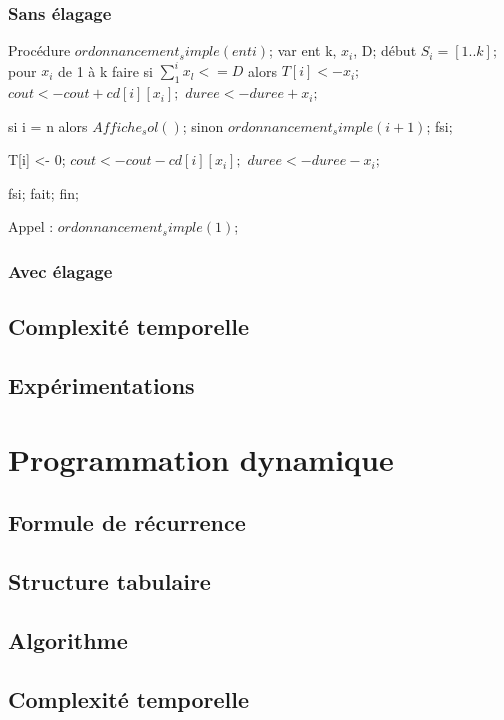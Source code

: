 \documentclass[a4paper, titlepage]{article}
\begin{document}
		\subsubsection{Sans élagage}

\begin{tabbing}
Procédure $ordonnancement_simple(ent i)$;
var ent k, $x_{i}$, D;
début
	$S_{i} = [1..k];$
	pour $x_{i}$ de 1 à k faire
		si $\sum_{1}^{i} x_{l} <= D$ alors
			$T[i] <- x_{i};$
			$cout <- cout + cd[i][x_{i}];$
			$duree <- duree + x_{i};$

			si i = n alors $Affiche_sol()$;
			sinon
				$ordonnancement_simple(i+1)$;
			fsi;

		T[i] <- 0;
		$cout <- cout - cd[i][x_{i}];$
		$duree <- duree - x_{i};	$

		fsi;
	fait;
fin;
\end{tabbing}

Appel : $ordonnancement_simple(1)$;

		\subsubsection{Avec élagage}

	\subsection{Complexité temporelle}

	\subsection{Expérimentations}

\section{Programmation dynamique}

	\subsection{Formule de récurrence}
	\subsection{Structure tabulaire}
	\subsection{Algorithme}
	\subsection{Complexité temporelle}
\end{document}
